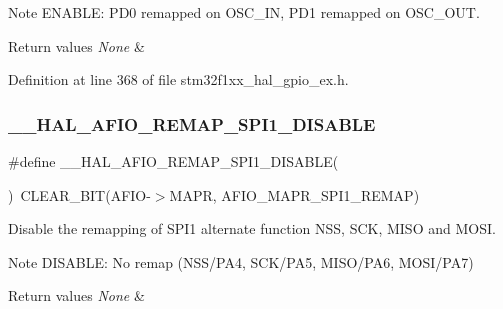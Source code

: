 \begin{DoxyNote}{Note}
E\+N\+A\+B\+LE\+: P\+D0 remapped on O\+S\+C\+\_\+\+IN, P\+D1 remapped on O\+S\+C\+\_\+\+O\+UT. 
\end{DoxyNote}

\begin{DoxyRetVals}{Return values}
{\em None} & \\
\hline
\end{DoxyRetVals}


Definition at line 368 of file stm32f1xx\+\_\+hal\+\_\+gpio\+\_\+ex.\+h.

\mbox{\label{group___g_p_i_o_ex___a_f_i_o___a_f___r_e_m_a_p_p_i_n_g_ga8fceca9b4e97561de6d1a9b6deb28550}} 
\subsubsection{\texorpdfstring{\+\_\+\+\_\+\+H\+A\+L\+\_\+\+A\+F\+I\+O\+\_\+\+R\+E\+M\+A\+P\+\_\+\+S\+P\+I1\+\_\+\+D\+I\+S\+A\+B\+LE}{\_\_HAL\_AFIO\_REMAP\_SPI1\_DISABLE}}
{\footnotesize\ttfamily \#define \+\_\+\+\_\+\+H\+A\+L\+\_\+\+A\+F\+I\+O\+\_\+\+R\+E\+M\+A\+P\+\_\+\+S\+P\+I1\+\_\+\+D\+I\+S\+A\+B\+LE(\begin{DoxyParamCaption}{ }\end{DoxyParamCaption})~C\+L\+E\+A\+R\+\_\+\+B\+IT(A\+F\+IO-\/$>$M\+A\+PR, A\+F\+I\+O\+\_\+\+M\+A\+P\+R\+\_\+\+S\+P\+I1\+\_\+\+R\+E\+M\+AP)}



Disable the remapping of S\+P\+I1 alternate function N\+SS, S\+CK, M\+I\+SO and M\+O\+SI. 

\begin{DoxyNote}{Note}
D\+I\+S\+A\+B\+LE\+: No remap (N\+S\+S/\+P\+A4, S\+C\+K/\+P\+A5, M\+I\+S\+O/\+P\+A6, M\+O\+S\+I/\+P\+A7) 
\end{DoxyNote}

\begin{DoxyRetVals}{Return values}
{\em None} & \\
\hline
\end{DoxyRetVals}


